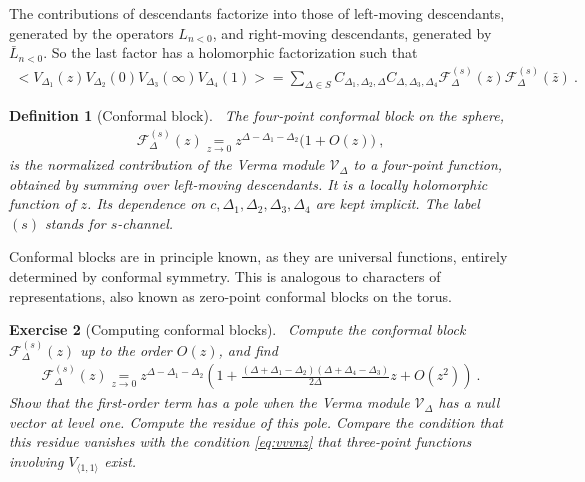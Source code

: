 \documentclass[12pt, a4paper]{article}
\theoremstyle{break}
\newtheorem{exo}{Exercise}[section]
\newtheorem{defn}[exo]{Definition}
\begin{document}
The contributions of descendants factorize into those of left-moving descendants, generated by the operators $L_{n<0}$, and right-moving descendants, generated by $\bar L_{n<0}$. So the last factor has a holomorphic factorization such that 
\begin{align}
\Big<V_{\Delta_1}(z)V_{\Delta_2}(0)V_{\Delta_3}(\infty)V_{\Delta_4}(1)\Big>
 =\sum_{\Delta\in S} C_{\Delta_1,\Delta_2,\Delta} C_{\Delta,\Delta_3,\Delta_4}  \mathcal{F}^{(s)}_\Delta(z) \mathcal{F}^{(s)}_\Delta(\bar z)\ .
 \label{sdec}
\end{align}

\begin{defn}[Conformal block]
 ~\label{def:block}
 The four-point conformal block on the sphere,
 \begin{align}
  \mathcal{F}^{(s)}_\Delta(z) \underset{z\to 0}{=} z^{\Delta-\Delta_1-\Delta_2}\Big( 1 + O(z) \Big)\ ,
  \label{eq:gsd}
 \end{align}
is the normalized contribution of the Verma module $\mathcal V_\Delta$ to a four-point function, obtained by summing over left-moving descendants. It is a locally holomorphic function of $z$. Its dependence on $c,\Delta_1,\Delta_2,\Delta_3,\Delta_4$ are kept implicit. The label $(s)$ stands for $s$-channel.
\end{defn}
Conformal blocks are in principle known, as they are universal functions, entirely determined by conformal symmetry. 
This is analogous to characters of representations, also known as zero-point conformal blocks on the torus.

\begin{exo}[Computing conformal blocks]
 ~\label{exo:block}
 Compute the conformal block $ \mathcal{F}^{(s)}_\Delta(z)$ up to the order $O(z)$, and find
 \begin{align}
  \mathcal{F}^{(s)}_\Delta(z) \underset{z\to 0}{=} z^{\Delta-\Delta_1-\Delta_2}\left( 1 + \frac{(\Delta+\Delta_1-\Delta_2)(\Delta+\Delta_4-\Delta_3)}{2\Delta}z + O(z^2) \right)\ .
  \label{eq:fsl}
 \end{align}
 Show that the first-order term has a pole when the Verma module $\mathcal{V}_\Delta$ has a null vector at level one.
 Compute the residue of this pole. Compare the condition that this residue vanishes with the condition \eqref{eq:vvvnz} that three-point functions involving $V_{\langle 1,1\rangle}$ exist.
\end{exo}
\end{document}
